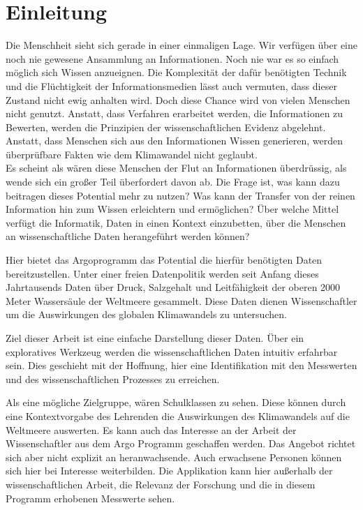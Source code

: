 
\section{Einleitung}

    Die Menschheit sieht sich gerade in einer einmaligen Lage. Wir verfügen über eine noch nie gewesene Ansammlung an Informationen. Noch nie war es so einfach möglich sich Wissen anzueignen. Die Komplexität der dafür benötigten Technik und die Flüchtigkeit der Informationsmedien lässt auch vermuten, dass dieser Zustand nicht ewig anhalten wird.
    Doch diese Chance wird von vielen Menschen nicht genutzt. 
    Anstatt, dass  Verfahren erarbeitet werden, die Informationen zu Bewerten, werden die Prinzipien der wissenschaftlichen Evidenz abgelehnt. Anstatt, dass Menschen sich aus den Informationen Wissen generieren, werden überprüfbare Fakten wie dem Klimawandel nicht geglaubt.\\
    Es scheint als wären diese Menschen der Flut an Informationen überdrüssig, als wende sich ein großer Teil überfordert davon ab.
    Die Frage ist, was kann dazu beitragen dieses Potential mehr zu nutzen? Was kann der Transfer von der reinen Information hin zum Wissen erleichtern und ermöglichen? Über welche Mittel verfügt die Informatik, Daten in einen Kontext einzubetten, über die Menschen an wissenschaftliche Daten herangeführt werden können?
    
    Hier bietet das Argoprogramm das Potential die hierfür benötigten Daten bereitzustellen. Unter einer freien Datenpolitik werden seit Anfang dieses Jahrtausends Daten über Druck, Salzgehalt und Leitfähigkeit der oberen 2000 Meter Wassersäule der Weltmeere gesammelt. Diese Daten dienen Wissenschaftler um die Auswirkungen des globalen Klimawandels zu untersuchen.
   
    Ziel dieser Arbeit ist eine einfache Darstellung dieser Daten. Über ein exploratives Werkzeug werden die wissenschaftlichen Daten intuitiv erfahrbar sein. Dies geschieht mit der Hoffnung, hier eine Identifikation mit den Messwerten und des wissenschaftlichen Prozesses zu erreichen. 
   
    Als eine mögliche Zielgruppe, wären Schulklassen zu sehen. Diese können durch eine Kontextvorgabe des Lehrenden  die Auswirkungen des Klimawandels auf die Weltmeere auswerten. Es kann auch das Interesse an der Arbeit der Wissenschaftler aus dem Argo Programm geschaffen werden. 
    Das Angebot richtet sich aber nicht explizit an heranwachsende. Auch erwachsene Personen können sich hier bei Interesse weiterbilden. Die Applikation kann hier außerhalb der wissenschaftlichen Arbeit,  die Relevanz der Forschung und die in diesem Programm erhobenen Messwerte sehen. 
    
